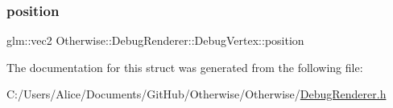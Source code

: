\subsubsection{\texorpdfstring{position}{position}}
{\footnotesize\ttfamily glm\+::vec2 Otherwise\+::\+Debug\+Renderer\+::\+Debug\+Vertex\+::position}



The documentation for this struct was generated from the following file\+:\begin{DoxyCompactItemize}
\item 
C\+:/\+Users/\+Alice/\+Documents/\+Git\+Hub/\+Otherwise/\+Otherwise/\hyperlink{_debug_renderer_8h}{Debug\+Renderer.\+h}\end{DoxyCompactItemize}

